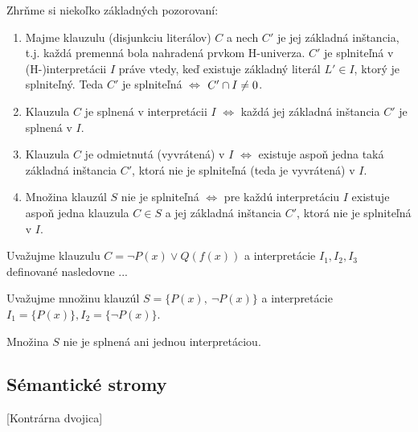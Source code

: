 \documentclass[a4paper]{report}
\newenvironment{dokaz}{\smallskip \par \noindent{\bfseries D:}}{}
\newenvironment{definicia}{\smallskip \par \noindent{\bfseries Def:}}{}
\newenvironment{priklad}{\smallskip \par \noindent{\bfseries Príkl:}}{}
\newenvironment{poznamka}{\smallskip \par \noindent{\bfseries Pozn:}}{}
\begin{document}
\begin{dokaz}
\end{dokaz}

\begin{poznamka}
    Zhrňme si niekoľko základných pozorovaní:
    \begin{enumerate}
	\item Majme klauzulu (disjunkciu literálov) $C$
            a nech $C'$ je jej základná inštancia, t.j. 
            každá premenná bola nahradená prvkom H-univerza.
            $C'$ je splniteľná v (H-)interpretácii $I$
	    práve vtedy, keď existuje základný literál $L' \in I$,
            ktorý je splniteľný.
            Teda $C'$ je splniteľná $\iff$ $C' \cap I \ne 0$.            

	\item Klauzula $C$ je splnená v interpretácii $I$ $\iff$ každá jej
	    základná inštancia $C'$ je splnená v $I$.

	\item Klauzula $C$ je odmietnutá (vyvrátená) v $I$ $\iff$ existuje
	    aspoň jedna taká základná inštancia $C'$, ktorá 
            nie je splniteľná (teda je vyvrátená) v $I$.

	\item Množina klauzúl $S$ nie je splniteľná $\iff$ 
            pre každú interpretáciu $I$ existuje aspoň jedna klauzula
            $C\in S$ a jej základná inštancia $C'$, 
            ktorá nie je splniteľná v $I$.
    \end{enumerate}
\end{poznamka}

\begin{priklad}
    Uvažujme klauzulu $C=\neg P(x) \lor Q(f(x))$ a
    interpretácie $I_1,I_2,I_3$ definované nasledovne ...
\end{priklad}

\begin{priklad}
    Uvažujme množinu klauzúl $S=\{P(x),\ \neg P(x)\}$ a
    interpretácie $I_1 = \{ P(x) \}, I_2 = \{ \neg P(x) \}$.

    Množina $S$ nie je splnená ani jednou interpretáciou.
\end{priklad}

\subsection{Sémantické stromy}

\begin{definicia}[Kontrárna dvojica]
\end{definicia}
\end{document}
